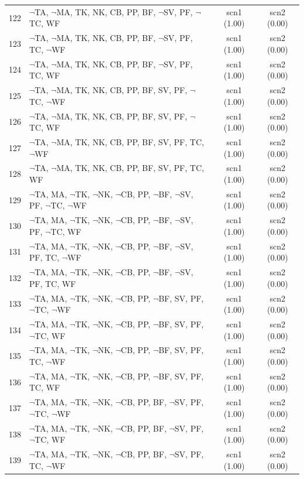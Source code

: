 \documentclass[12pt]{article}
\begin{document}
\begin{longtable}{|l|l|c|c|}
122 & $\neg$TA, $\neg$MA, TK, NK, CB, PP, BF, $\neg$SV, PF, $\neg$TC, WF & scn1 (1.00) & scn2 (0.00)\\
123 & $\neg$TA, $\neg$MA, TK, NK, CB, PP, BF, $\neg$SV, PF, TC, $\neg$WF & scn1 (1.00) & scn2 (0.00)\\
124 & $\neg$TA, $\neg$MA, TK, NK, CB, PP, BF, $\neg$SV, PF, TC, WF & scn1 (1.00) & scn2 (0.00)\\
125 & $\neg$TA, $\neg$MA, TK, NK, CB, PP, BF, SV, PF, $\neg$TC, $\neg$WF & scn1 (1.00) & scn2 (0.00)\\
126 & $\neg$TA, $\neg$MA, TK, NK, CB, PP, BF, SV, PF, $\neg$TC, WF & scn1 (1.00) & scn2 (0.00)\\
127 & $\neg$TA, $\neg$MA, TK, NK, CB, PP, BF, SV, PF, TC, $\neg$WF & scn1 (1.00) & scn2 (0.00)\\
128 & $\neg$TA, $\neg$MA, TK, NK, CB, PP, BF, SV, PF, TC, WF & scn1 (1.00) & scn2 (0.00)\\
129 & $\neg$TA, MA, $\neg$TK, $\neg$NK, $\neg$CB, PP, $\neg$BF, $\neg$SV, PF, $\neg$TC, $\neg$WF & scn1 (1.00) & scn2 (0.00)\\
130 & $\neg$TA, MA, $\neg$TK, $\neg$NK, $\neg$CB, PP, $\neg$BF, $\neg$SV, PF, $\neg$TC, WF & scn1 (1.00) & scn2 (0.00)\\
131 & $\neg$TA, MA, $\neg$TK, $\neg$NK, $\neg$CB, PP, $\neg$BF, $\neg$SV, PF, TC, $\neg$WF & scn1 (1.00) & scn2 (0.00)\\
132 & $\neg$TA, MA, $\neg$TK, $\neg$NK, $\neg$CB, PP, $\neg$BF, $\neg$SV, PF, TC, WF & scn1 (1.00) & scn2 (0.00)\\
133 & $\neg$TA, MA, $\neg$TK, $\neg$NK, $\neg$CB, PP, $\neg$BF, SV, PF, $\neg$TC, $\neg$WF & scn1 (1.00) & scn2 (0.00)\\
134 & $\neg$TA, MA, $\neg$TK, $\neg$NK, $\neg$CB, PP, $\neg$BF, SV, PF, $\neg$TC, WF & scn1 (1.00) & scn2 (0.00)\\
135 & $\neg$TA, MA, $\neg$TK, $\neg$NK, $\neg$CB, PP, $\neg$BF, SV, PF, TC, $\neg$WF & scn1 (1.00) & scn2 (0.00)\\
136 & $\neg$TA, MA, $\neg$TK, $\neg$NK, $\neg$CB, PP, $\neg$BF, SV, PF, TC, WF & scn1 (1.00) & scn2 (0.00)\\
137 & $\neg$TA, MA, $\neg$TK, $\neg$NK, $\neg$CB, PP, BF, $\neg$SV, PF, $\neg$TC, $\neg$WF & scn1 (1.00) & scn2 (0.00)\\
138 & $\neg$TA, MA, $\neg$TK, $\neg$NK, $\neg$CB, PP, BF, $\neg$SV, PF, $\neg$TC, WF & scn1 (1.00) & scn2 (0.00)\\
139 & $\neg$TA, MA, $\neg$TK, $\neg$NK, $\neg$CB, PP, BF, $\neg$SV, PF, TC, $\neg$WF & scn1 (1.00) & scn2 (0.00)\\

\end{longtable}
\end{document}
